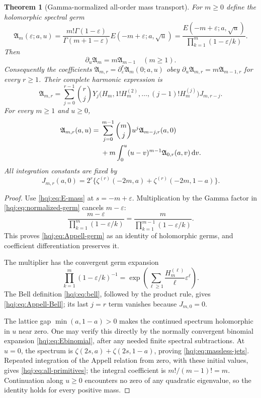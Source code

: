 \documentclass[11pt,letterpaper]{article}
\numberwithin{equation}{section}
\newtheorem{theorem}{Theorem}[section]
\theoremstyle{definition}
\newcommand{\dd}{\,\mathrm{d}}
\begin{document}
\begin{theorem}[Gamma-normalized all-order mass transport]
\label{hqj:thm:Appell}
For $m\ge0$ define the holomorphic spectral germ
\begin{equation}\label{hqj:eq:normalized-germ}
\mathfrak A_m(\varepsilon;a,u)
=\frac{m!\Gamma(1-\varepsilon)}{\Gamma(m+1-\varepsilon)}
E(-m+\varepsilon;a,\sqrt u)
=\frac{E(-m+\varepsilon;a,\sqrt u)}
{\prod_{k=1}^m(1-\varepsilon/k)}.
\end{equation}
Then
\begin{equation}\label{hqj:eq:Appell-germ}
\partial_u\mathfrak A_m=m\mathfrak A_{m-1}\quad(m\ge1).
\end{equation}
Consequently the coefficients
$\mathfrak A_{m,r}=\partial_\varepsilon^r\mathfrak A_m(0;a,u)$ obey
$\partial_u\mathfrak A_{m,r}=m\mathfrak A_{m-1,r}$ for every $r\ge1$.
Their complete harmonic expression is
\begin{equation}\label{hqj:eq:Appell-Bell}
\mathfrak A_{m,r}
=\sum_{j=0}^{r-1}\binom rj
Y_j\bigl(H_m,1!H_m^{(2)},\ldots,(j-1)!H_m^{(j)}\bigr)
J_{m,r-j}.
\end{equation}
For every $m\ge1$ and $u\ge0$,
\begin{align}
\mathfrak A_{m,r}(a,u)
={}&\sum_{j=0}^{m-1}\binom mj u^j\mathfrak A_{m-j,r}(a,0)
\notag\\
&+m\int_0^u(u-v)^{m-1}\mathfrak A_{0,r}(a,v)\dd v.
\label{hqj:eq:all-primitives}
\end{align}
All integration constants are fixed by
\begin{equation}\label{hqj:eq:massless-jets}
J_{m,r}(a,0)=2^r\bigl\{\zeta^{(r)}(-2m,a)
+\zeta^{(r)}(-2m,1-a)\bigr\}.
\end{equation}
\end{theorem}
\begin{proof}
Use \eqref{hqj:eq:E-mass} at $s=-m+\varepsilon$. Multiplication by the
Gamma factor in \eqref{hqj:eq:normalized-germ} cancels $m-\varepsilon$:
\[
\frac{m-\varepsilon}{\prod_{k=1}^m(1-\varepsilon/k)}
=\frac{m}{\prod_{k=1}^{m-1}(1-\varepsilon/k)}.
\]
This proves \eqref{hqj:eq:Appell-germ} as an identity of holomorphic
germs, and coefficient differentiation preserves it.

The multiplier has the convergent germ expansion
\[
\prod_{k=1}^m(1-\varepsilon/k)^{-1}
=\exp\left(\sum_{\ell\ge1}\frac{H_m^{(\ell)}}\ell
\varepsilon^\ell\right).
\]
The Bell definition \eqref{hqj:eq:bell}, followed by the product rule,
gives \eqref{hqj:eq:Appell-Bell}; its last $j=r$ term vanishes because
$J_{m,0}=0$.

The lattice gap $\min(a,1-a)>0$ makes the continued spectrum holomorphic
in $u$ near zero. One may verify this directly by the normally
convergent binomial expansion \eqref{hqj:eq:Ebinomial}, after any
needed finite spectral subtractions. At $u=0$, the spectrum is
$\zeta(2s,a)+\zeta(2s,1-a)$, proving
\eqref{hqj:eq:massless-jets}. Repeated integration of the Appell
relation from zero, with these initial values, gives
\eqref{hqj:eq:all-primitives}; the integral coefficient is
$m!/(m-1)!=m$. Continuation along $u\ge0$ encounters no zero of any
quadratic eigenvalue, so the identity holds for every positive mass.
\end{proof}
\end{document}
